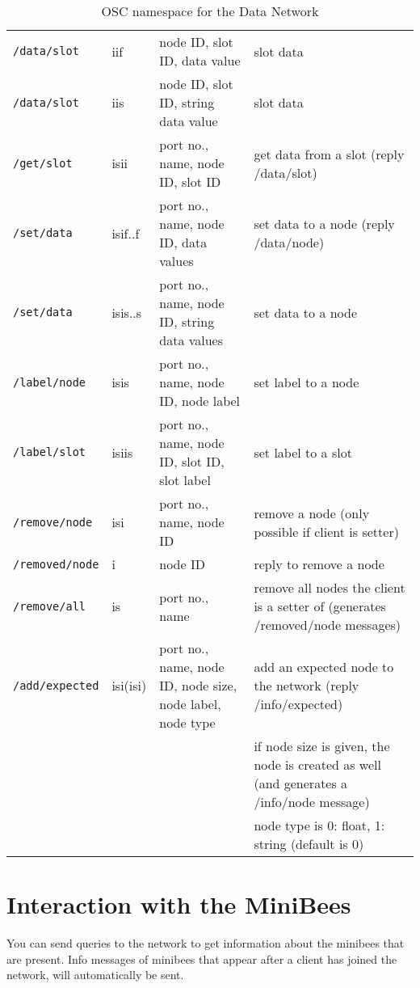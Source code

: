 \documentclass[letterpaper,10pt]{article}
\begin{document}
\begin{sidewaystable}[!tbp]
\begin{center}
\begin{tabular}{|llll|}
\verb|/data/slot| & iif & node ID, slot ID, data value & slot data \\
\verb|/data/slot| & iis & node ID, slot ID, string data value & slot data \\
\verb|/get/slot| & isii & port no., name, node ID, slot ID & get data from a slot (reply /data/slot) \\

\verb|/set/data| & isif..f & port no., name, node ID, data values & set data to a node (reply /data/node)\\
\verb|/set/data| & isis..s & port no., name, node ID, string data values & set data to a node\\

\verb|/label/node| & isis & port no., name, node ID, node label & set label to a node \\
\verb|/label/slot| & isiis & port no., name, node ID, slot ID, slot label & set label to a slot \\

\verb|/remove/node| & isi & port no., name, node ID & remove a node (only possible if client is setter) \\
\verb|/removed/node| & i & node ID & reply to remove a node \\
\verb|/remove/all| & is & port no., name & remove all nodes the client is a setter of (generates /removed/node messages) \\

\verb|/add/expected| & isi(isi) & port no., name, node ID, node size, node label, node type & add an expected node to the network (reply /info/expected) \\
 &  &  & if node size is given, the node is created as well (and generates a /info/node message) \\
 &  &  & node type is 0: float, 1: string (default is 0) \\
\hline
\end{tabular}
\end{center}
\caption{OSC namespace for the Data Network}
\label{oscinterface}
 \end{sidewaystable}

\section{Interaction with the MiniBees}

You can send queries to the network to get information about the minibees that are present. Info messages of minibees that appear after a client has joined the network, will automatically be sent.
\end{document}
